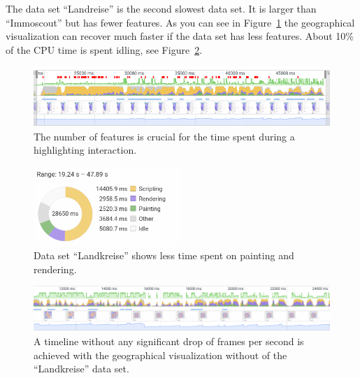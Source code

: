 The data set ``Landreise'' is the second slowest data set.
It is larger than ``Immoscout'' but has fewer features.
As you can see in Figure~\ref{fig:evaluation:performance:profiling:landkreise_both:fps} the geographical visualization can recover much faster if the data set has less features.
About 10\% of the CPU time is spent idling, see Figure~\ref{fig:evaluation:performance:profiling:landkreise_both:summary}.

\begin{figure}[h]
  \centering
  \includegraphics[width=\textwidth]{figures/evaluation/performance/profiles/landkreise_both/fps}
  \caption{
    The number of features is crucial for the time spent during a highlighting interaction.
  }\label{fig:evaluation:performance:profiling:landkreise_both:fps}
\end{figure}

\begin{figure}[h]
  \centering
  \includegraphics[width=0.5\textwidth]{figures/evaluation/performance/profiles/landkreise_both/summary}
  \caption{
    Data set ``Landkreise'' shows less time spent on painting and rendering.
  }\label{fig:evaluation:performance:profiling:landkreise_both:summary}
\end{figure}

\begin{figure}[h]
  \centering
  \includegraphics[width=\textwidth]{figures/evaluation/performance/profiles/landkreise_geo_only/fps}
  \caption{
    A timeline without any significant drop of frames per second is achieved with the geographical visualization without \tmap{} of the ``Landkreise'' data set.
  }\label{fig:evaluation:performance:profiling:landkreise_geo_only:fps}
\end{figure}

